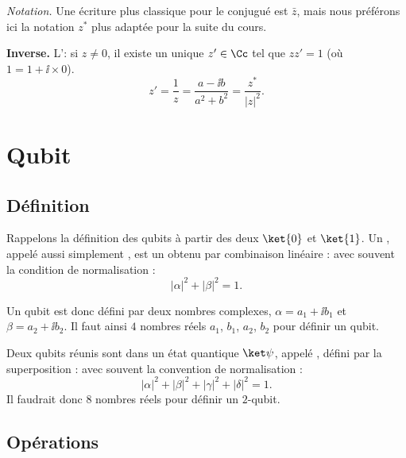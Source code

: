\documentclass[11pt,class=report,crop=false]{standalone}
\begin{document}
\emph{Notation.} Une écriture plus classique pour le conjugué est $\bar z$, mais nous préférons ici la notation $z^*$ plus adaptée pour la suite du cours. 

\textbf{Inverse.}
L': si $z \neq 0$, il existe un unique $z' \in \Cc$ tel
  que $zz' = 1$ (o\`u $1 = 1 + \ii  \times 0$).
\[ z' = \frac{1}{z}  =
     \frac{a - \ii b}{a^2 + b^2} = \frac{z^*}{|z|^2} . \]
\section{Qubit}

\subsection{Définition}


Rappelons la définition des qubits à partir des deux  $\ket{0}$ et $\ket{1}$. 
Un , appelé aussi simplement , est un  obtenu par combinaison linéaire :
avec souvent la condition de normalisation :
$$|\alpha|^2+|\beta|^2 = 1.$$

Un qubit est donc défini par deux nombres complexes, $\alpha = a_1+\ii b_1$ et $\beta = a_2+\ii b_2$. Il faut ainsi $4$ nombres réels $a_1$, $b_1$, $a_2$, $b_2$ pour définir un qubit.


Deux qubits réunis sont dans un état quantique $\ket\psi$, appelé , défini par la superposition :
avec souvent la convention de normalisation :
$$|\alpha|^2+|\beta|^2+|\gamma|^2+|\delta|^2=1.$$
Il faudrait donc $8$ nombres réels pour définir un $2$-qubit.

\subsection{Opérations}

\end{document}
